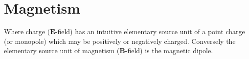 \section{Magnetism}
Where charge ($\mathbf{E}$-field) has an intuitive elementary source unit of a point charge (or monopole) which may be positively or negatively charged. Conversely the elementary source unit of magnetism ($\mathbf{B}$-field) is the magnetic dipole. 




